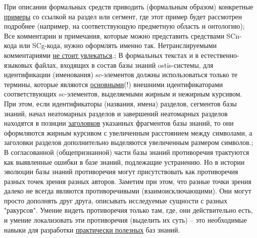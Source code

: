 \begin{SCn}
{При описании формальных средств приводить (формальным образом) конкретные \uline{примеры} со ссылкой на раздел или сегмент, где этот пример будет рассмотрен подробнее (например, на соответствующую предметную область и онтологию);
Все комментарии и примечания, которые можно представить средствами SCn-кода или SCg-кода, нужно оформлять именно так. Нетранслируемыми комментариями  \uline{не стоит увлекаться}.;
В формальных текстах и в естественно-языковых файлах, входящих в состав базы знаний ostis-системы, для идентификации (именования) sc-элементов должны использоваться только те термины, которые являются \uline{основными}(!) внешними идентификаторами соответствующих sc-элементов, выделяемыми жирным и нежирным курсивом. При этом, если идентификаторы (названия, имена) разделов, сегментов базы знаний, начал неатомарных разделов и завершений неатомарных разделов находятся в позиции \uline{заголовков} указанных фрагментов базы знаний, то они оформляются жирным курсивом с увеличенным расстоянием между символами, а заголовки разделов дополнительно выделяются увеличенным размером символов.;
В согласованной (общепризнанной) части базы знаний противоречия трактуются как выявленные ошибки в базе знаний, подлежащие устранению. Но в истории эволюции
базы знаний противоречия могут присутствовать как противоречия разных точек зрения разных авторов. Заметим при этом, что разные точки зрения далеко не всегда являются противоречивыми (взаимоисключающими). Они могут просто дополнять друг друга, описывать исследуемые сущности с разных "ракурсов". Умение видеть противоречия только там, где, они действительно есть, и умение локализовать эти противоречия (выделить их суть) -- это необходимые навыки для разработки \uline{практически полезных} баз знаний.}
\filemodefalse


\end{SCn}

